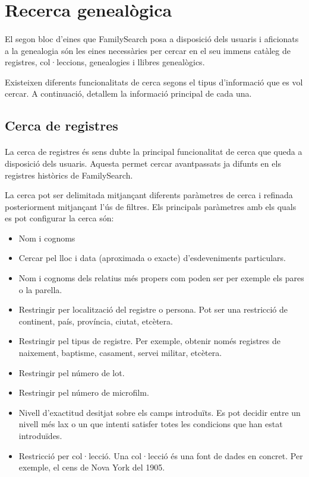 \section{Recerca genealògica}

    \paragraph{}
    El segon bloc d’eines que FamilySearch posa a disposició dels usuaris i aficionats a la genealogia són les eines necessàries per cercar en el seu immens catàleg de registres, col·leccions, genealogies i llibres genealògics.

    Existeixen diferents funcionalitats de cerca segons el tipus d'informació que es vol cercar. A continuació, detallem la informació principal de cada una.

    \subsection{Cerca de registres}

        \paragraph{}
        La cerca de registres és sens dubte la principal funcionalitat de cerca que queda a disposició dels usuaris. Aquesta permet cercar avantpassats ja difunts en els registres històrics de FamilySearch.

        La cerca pot ser delimitada mitjançant diferents paràmetres de cerca i refinada posteriorment mitjançant l’ús de filtres. Els principals paràmetres amb els quals es pot configurar la cerca són:

        \begin{itemize}
            \item Nom i cognoms
            \item Cercar pel lloc i data (aproximada o exacte) d’esdeveniments particulars.
            \item Nom i cognoms dels relatius més propers com poden ser per exemple els pares o la parella.
            \item Restringir per localització del registre o persona. Pot ser una restricció de continent, país, província, ciutat, etcètera.
            \item Restringir pel tipus de registre. Per exemple, obtenir només registres de nai\-xe\-ment, baptisme, casament, servei militar, etcètera.
            \item Restringir pel número de lot.
            \item Restringir pel número de microfilm.
            \item Nivell d’exactitud desitjat sobre els camps introduïts. Es pot decidir entre un nivell més lax o un que intenti satisfer totes les condicions que han estat introduïdes.
            \item Restricció per col·lecció. Una col·lecció és una font de dades en concret. Per exemple, el cens de Nova York del 1905.
        \end{itemize}

